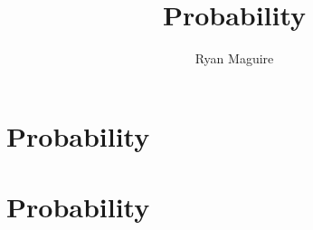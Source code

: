 \documentclass[crop=false,class=book,oneside]{standalone}
\begin{document}
    \ifx\ifmathcourses\undefined
        \title{Probability}
        \author{Ryan Maguire}
        \date{\vspace{-5ex}}
        \maketitle
        \tableofcontents
        \chapter*{Probability}
        \setcounter{chapter}{1}
    \else
        \chapter{Probability}
    \fi
\end{document}
